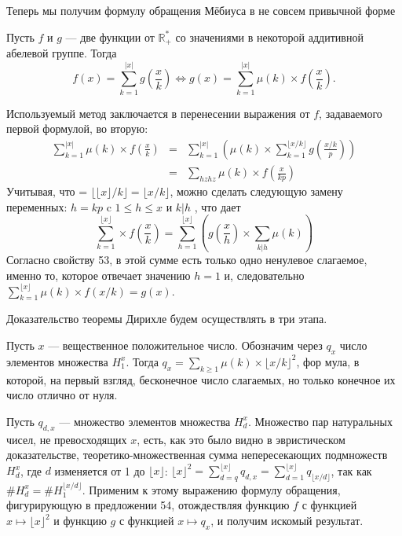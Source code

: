 \documentclass{mai_book}
\begin{document}
Теперь мы получим формулу обращения Мёбиуса в не совсем при­вычной форме

\begin{predl}
Пусть $f$ и $g$ — две функции от $\mathbb{R}_{+}^{*}$ со значениями в некоторой ад­дитивной абелевой группе. Тогда
$$f(x)=\sum\limits_{k=1}^{|x|} g\left(\frac{x}{k}\right) \Longleftrightarrow g(x)=\sum\limits_{k=1}^{|x|}\mu(k)\times f\left(\frac{x}{k}\right).$$
\end{predl}
\begin{myproof}
Используемый метод заключается в перенесении выражения от $f$,
задаваемого первой формулой, во вторую:
$$\begin{array}{rcc}
\sum\limits_{k=1}^{|x|}\mu(k)\times f\left(\frac{x}{k}\right)&=&\sum\limits_{k=1}^{|x|}\left(\mu(k)\times\sum\limits_{k=1}^{\lfloor x/k \rfloor} g\left(\frac{x/k}{p}\right)\right)\\
&=&\sum\limits_{hzhz}\mu(k)\times f\left(\frac{x}{kp}\right)
\end{array}$$
Учитывая, что = $\lfloor\lfloor x \rfloor/k\rfloor = \lfloor x/k\rfloor$, можно сделать следующую замену
переменных: $h=kp$ c $1\leqslant h\leqslant x$ и $k|h$ , что дает
\newpage
$$\sum\limits_{k=1}^{\lfloor x \rfloor}\times f\left(\frac{x}{k}\right)=\sum_{h=1}^{\lfloor x\rfloor}\left( g\left(\frac{x}{h}\right)\times\sum\limits_{k|h}\mu(k)\right)$$
Согласно свойству 53, в этой сумме есть только одно ненулевое слагаемое, именно то, которое отвечает значению $h=1$ и, следовательно $\sum\nolimits_{k=1}^{\lfloor x\rfloor}\mu(k)\times f(x/k)=g(x)$.
\end{myproof}
Доказательство теоремы Дирихле будем осуществлять в три этапа.
\begin{lemma}
\hspace*{0.5cm}Пусть $x$ — вещественное положительное число. Обозначим через $q_{x}$
число элементов множества $H_{1}^x$. Тогда $q_{x}=\sum\nolimits_{k\geqslant 1}\mu(k)\times\lfloor x/k\rfloor^2$, фор­
мула, в которой, на первый взгляд, бесконечное число слагаемых, но
только конечное их число отлично от нуля.
\end{lemma}
\begin{myproof}
Пусть $q_{d,x}$ — множество элементов множества $H_{d}^x$. Множество пар
натуральных чисел, не превосходящих $x$, есть, как это было видно
в эвристическом доказательстве, теоретико-множественная сумма
непересекающих подмножеств $H_{d}^x$, где $d$ изменяется от 1 до $\lfloor x\rfloor$: $\lfloor x\rfloor^2=\sum\nolimits_{d=q}^{\lfloor x\rfloor}q_{d,x}=\sum\nolimits_{d=1}^{\lfloor x\rfloor}q_{\lfloor x/d\rfloor}$, так как $\#H_{d}^x=\#H_{1}^{\lfloor x/d\rfloor}$. Применим к этому выражению формулу обращения, фигурирующую в
предложении 54, отождествляя функцию $f$ с функцией $x\mapsto\lfloor x\rfloor^2$
 и функцию $g$ с функцией $x\mapsto q_{x}$, и получим искомый результат.
\end{myproof}
\end{document}
